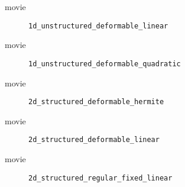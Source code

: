 

%
\begin{frame}{movie}
  \begin{figure}[h!]
    \caption{\lstinline{1d_unstructured_deformable_linear}}
  \end{figure} 
\end{frame}



%
\begin{frame}{movie}
  \begin{figure}[h!]
    \caption{\lstinline{1d_unstructured_deformable_quadratic}}
  \end{figure} 
\end{frame}



%
\begin{frame}{movie}
  \begin{figure}[h!]
    \caption{\lstinline{2d_structured_deformable_hermite}}
  \end{figure} 
\end{frame}



%
\begin{frame}{movie}
  \begin{figure}[h!]
    \caption{\lstinline{2d_structured_deformable_linear}}
  \end{figure} 
\end{frame}



%
\begin{frame}{movie}
  \begin{figure}[h!]
    \caption{\lstinline{2d_structured_regular_fixed_linear}}
  \end{figure} 
\end{frame}

